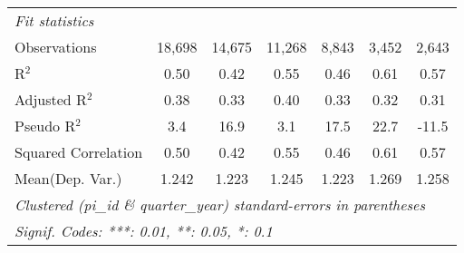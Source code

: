 \begin{tabular}{lcccccc}
   \midrule
   \emph{Fit statistics}\\
   Observations                                               & 18,698       & 14,675        & 11,268       & 8,843       & 3,452        & 2,643\\  
   R$^2$                                                      & 0.50         & 0.42          & 0.55         & 0.46        & 0.61         & 0.57\\  
   Adjusted R$^2$                                             & 0.38         & 0.33          & 0.40         & 0.33        & 0.32         & 0.31\\  
   Pseudo R$^2$                                               & 3.4          & 16.9          & 3.1          & 17.5        & 22.7         & -11.5\\  
   Squared Correlation                                        & 0.50         & 0.42          & 0.55         & 0.46        & 0.61         & 0.57\\  
Mean(Dep. Var.) & 1.242 & 1.223 & 1.245 & 1.223 & 1.269 & 1.258 \\
   \midrule \midrule
   \multicolumn{7}{l}{\emph{Clustered (pi\_id \& quarter\_year) standard-errors in parentheses}}\\
   \multicolumn{7}{l}{\emph{Signif. Codes: ***: 0.01, **: 0.05, *: 0.1}}\\
\end{tabular}
\par\endgroup
